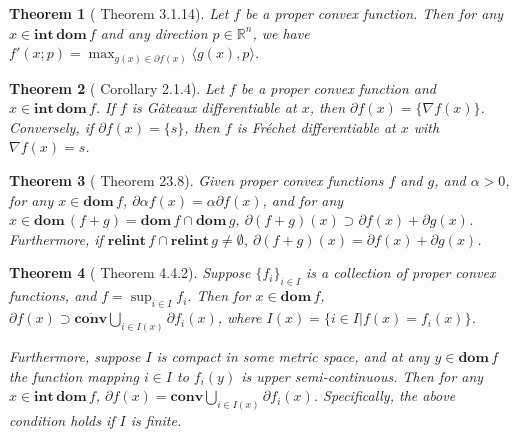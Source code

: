 \documentclass[openany]{book}
\newtheorem{theorem}{Theorem}[chapter]
\theoremstyle{definition}
\theoremstyle{remark}
\begin{document}
\begin{theorem}[\cite{N13} Theorem 3.1.14]\label{subgradDirDeriv}
    Let $f$ be a proper convex function. Then for any $x\in \mathbf{int}\,\mathbf{dom}\,f$ and any direction $p\in \mathbb{R}^n$, we have $f'(x;p)=\max_{g(x)\in\partial f(x)}\langle g(x),p\rangle$.
\end{theorem}
\begin{theorem}[\cite{HL12} Corollary 2.1.4]\label{thm:uniqueSubgradDiff}
    Let $f$ be a proper convex function and $x\in \mathbf{int}\,\mathbf{dom}\,f$. If $f$ is G\^{a}teaux differentiable at $x$, then $\partial f(x)=\{\nabla f(x)\}$. Conversely, if $\partial f(x)=\{s\}$, then $f$ is Fr\'{e}chet differentiable at $x$ with $\nabla f(x)=s$.
\end{theorem}

\begin{theorem}[\cite{R15} Theorem 23.8]
    Given proper convex functions $f$ and $g$, and $\alpha>0$, for any $x\in \mathbf{dom}\,f$, $\partial\alpha f(x)=\alpha\partial f(x)$, and for any $x\in \mathbf{dom}\,(f+g)=\mathbf{dom}\,f\cap \mathbf{dom}\,g$, $\partial(f+g)(x)\supset\partial f(x)+\partial g(x)$. Furthermore, if $\mathbf{relint}\,f\cap \mathbf{relint}\,g\ne\emptyset$, $\partial(f+g)(x)=\partial f(x)+\partial g(x)$.
\end{theorem}
\begin{theorem}[\cite{HL12} Theorem 4.4.2]
    Suppose $\{f_i\}_{i\in I}$ is a collection of proper convex functions, and $f=\sup_{i\in I}f_i$. Then for $x\in \mathbf{dom}\,f$, $\partial f(x)\supset \overline{\mathbf{conv}}\bigcup_{i\in I(x)}\partial f_i(x)$, where $I(x)=\{i\in I|f(x)=f_i(x)\}$.

    Furthermore, suppose $I$ is compact in some metric space, and at any $y\in \mathbf{dom}\,f$ the function mapping $i\in I$ to $f_i(y)$ is upper semi-continuous. Then for any $x\in \mathbf{int}\,\mathbf{dom}\,f$, $\partial f(x)=\mathbf{conv}\bigcup_{i\in I(x)}\partial f_i(x)$. Specifically, the above condition holds if $I$ is finite.
\end{theorem}
\end{document}
